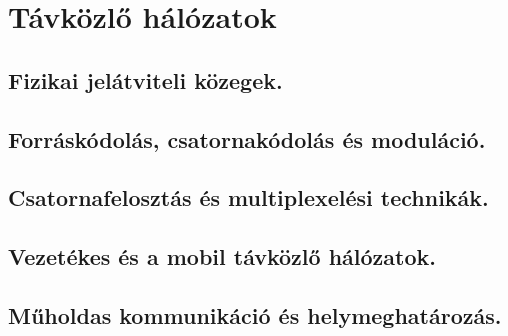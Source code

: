 \section{Távközlő hálózatok}
\subsection{Fizikai jelátviteli közegek.}

\subsection{Forráskódolás, csatornakódolás és moduláció.}

\subsection{Csatornafelosztás és multiplexelési technikák.}

\subsection{Vezetékes és a mobil távközlő hálózatok.}

\subsection{Műholdas kommunikáció és helymeghatározás.}
